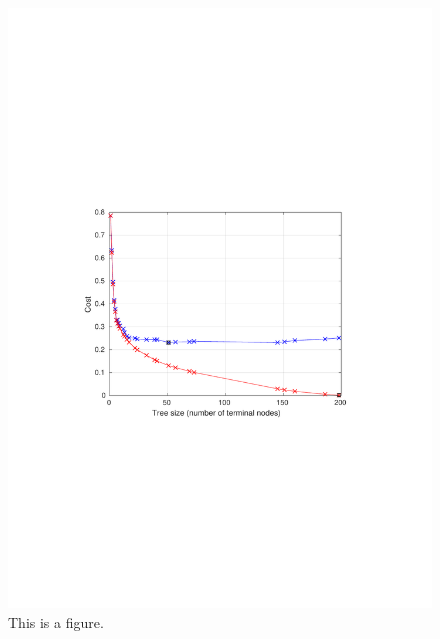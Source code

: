 \begin{figure}[htb]
  \begin{center}
    \caption{This is a figure.} 
  \includegraphics[scale = 0.80]{graphs/clean_dataset/clean_pruning.pdf} 

  \end{center}
  \end{figure}


